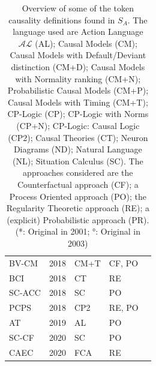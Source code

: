 \documentclass[11pt,a4paper]{book}
\theoremstyle{definition}
\theoremstyle{definition}
\theoremstyle{definition}
\theoremstyle{remark}
\newcommand{\prset}{S_{A}}
\begin{document}
\begin{table}
\begin{tabular}{lllll}
BV-CM & 2018	& CM+T &	CF, PO& \parencite{beckers2018principled}\\
BCI &	2018&	CT	& RE& \parencite{bochman2018actual}\\
SC-ACC &	2018	& SC	& PO& \parencite{batusov2018situation}\\
PCPS	& 2018	& CP2	& RE, PO& \parencite{denecker2018causal}\\
AT &2019	 & AL	 &PO& \parencite{leblanc2019explaining}\\
SC-CF	& 2020	& SC&	PO& \parencite{khannecessary}\\
CAEC & 2020 & FCA & RE &  \parencite{khannecessary}\\
\bottomrule
\end{tabular}
\caption{\scriptsize Overview of some of the token causality definitions found in $\prset$.
The language used are 
Action Language $\mathcal{AL}$ (AL);
Causal Models (CM); 
Causal Models with Default/Deviant distinction (CM+D);
Causal Models with Normality ranking (CM+N);
Probabilistic Causal Models (CM+P);
Causal Models with Timing (CM+T);
CP-Logic (CP);
CP-Logic with Norms (CP+N);
CP-Logic: Causal Logic (CP2);
Causal Theories (CT);
Neuron Diagrams (ND);
Natural Language (NL); 
Situation Calculus (SC).
The approaches considered are 
the Counterfactual approach (CF);
a Process Oriented approach (PO);
the Regularity Theoretic approach (RE);
a (explicit) Probabilistic approach (PR).
(*: Original in 2001; °: Original in 2003)}
\label{tab:definition_overview}
\end{table}
\end{document}
